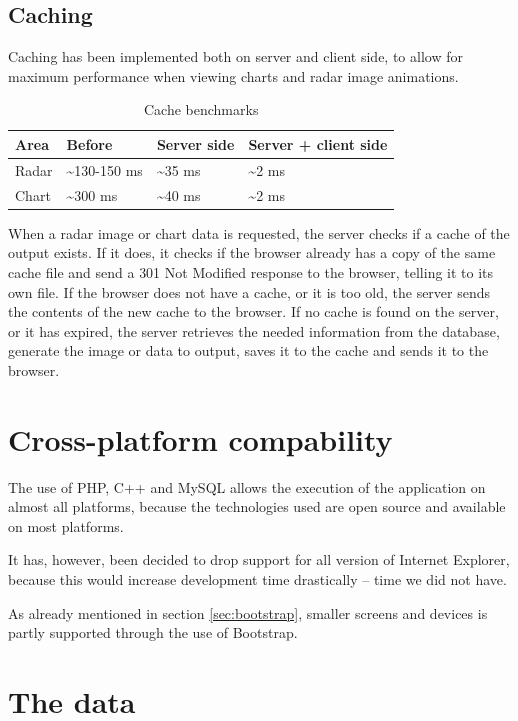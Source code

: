 \subsection{Caching}
Caching has been implemented both on server and client side, to allow for maximum performance when viewing charts and radar image animations.

\begin{table}[htbp]
\centering
\begin{tabular}{|l|l|l|l|}
\hline
\textbf{Area} & \textbf{Before} & \textbf{Server side} & \textbf{Server + client side}\\
\hline
Radar & \textasciitilde 130-150 ms & \textasciitilde 35 ms & \textasciitilde 2 ms\\
\hline
Chart & \textasciitilde 300 ms & \textasciitilde 40 ms & \textasciitilde 2 ms\\
\hline
\end{tabular}
\label{tab:cache_benchmarks}
\caption{Cache benchmarks}
\end{table}

When a radar image or chart data is requested, the server checks if a cache of the output exists. If it does, it checks if the browser already has a copy of the same cache file and send a \textsf{301 Not Modified} response to the browser, telling it to its own file.
If the browser does not have a cache, or it is too old, the server sends the contents of the new cache to the browser.
If no cache is found on the server, or it has expired, the server retrieves the needed information from the database, generate the image or data to output, saves it to the cache and sends it to the browser.

\section{Cross-platform compability}
\label{sec:cross-platform}
The use of PHP, C++ and MySQL allows the execution of the application on almost all platforms, because the technologies used are open source and available on most platforms.

It has, however, been decided to drop support for all version of Internet Explorer, because this would increase development time drastically -- time we did not have.

As already mentioned in section \ref{sec:bootstrap}, smaller screens and devices is partly supported through the use of Bootstrap.
\section{The data}
